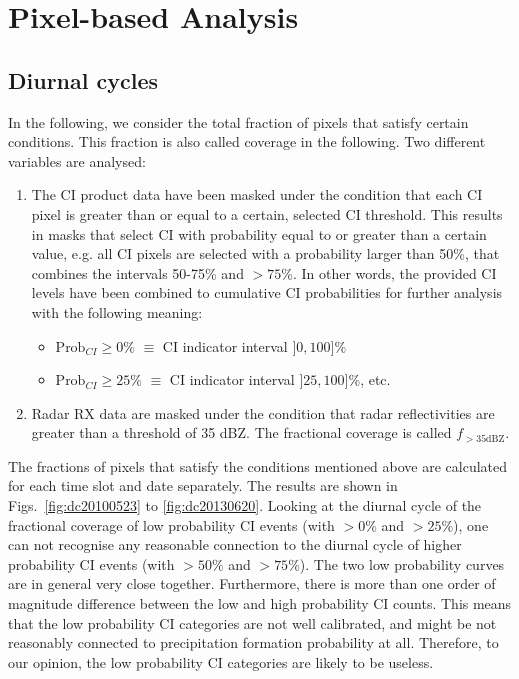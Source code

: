 \chapter{Pixel-based Analysis}

\section{Diurnal cycles}
\label{sec:diurnal_cycle}
In the following, we consider the total fraction of pixels that satisfy certain conditions. This fraction is also called coverage in the following. Two different variables are analysed:
\begin{enumerate}
\item The CI product data have been masked under the condition that each CI pixel is greater than or equal to a certain, selected CI threshold. This results in masks that select CI with probability equal to or greater than a certain value, e.g. all CI pixels are selected with a probability larger than 50\%, that combines the intervals 50-75\% and $>75$\%. In other words, the provided CI levels have been combined to cumulative CI probabilities for further analysis with the following meaning:
\begin{itemize}
    \item $\textrm{Prob}_{CI}\ge 0\%$  $\equiv$  CI indicator interval $]0, 100] \%$
    \item $\textrm{Prob}_{CI}\ge 25\%$  $\equiv$  CI indicator interval $]25, 100] \%$, etc.
\end{itemize}
\item Radar RX data are masked under the condition that radar reflectivities are greater than a threshold of 35 dBZ. The fractional coverage is called $f_{>35 \mathrm{dBZ}}$.
\end{enumerate}

The fractions of pixels that satisfy the conditions mentioned above are calculated for each time slot and date separately. The results are shown in Figs.~\ref{fig:dc20100523} to \ref{fig:dc20130620}. Looking at the diurnal cycle of the fractional coverage of low probability CI events (with $>0\%$ and $>25\%$), one can not recognise any reasonable connection to the diurnal cycle of higher probability CI events (with $>50\%$ and $>75\%$). The two low probability curves are in general very close together. Furthermore, there is more than one order of magnitude difference between the low and high probability CI counts. This means that the low probability CI categories are not well calibrated, and might be not reasonably connected to precipitation formation probability at all. Therefore, to our opinion, the low probability CI categories are likely to be useless.

